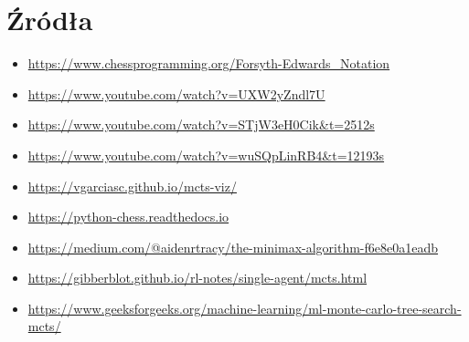 \section*{Źródła}
\begin{itemize}
    \item \url{https://www.chessprogramming.org/Forsyth-Edwards_Notation}
    \item \url{https://www.youtube.com/watch?v=UXW2yZndl7U}
    \item \url{https://www.youtube.com/watch?v=STjW3eH0Cik&t=2512s}
    \item \url{https://www.youtube.com/watch?v=wuSQpLinRB4&t=12193s}
    \item \url{https://vgarciasc.github.io/mcts-viz/}
    \item \url{https://python-chess.readthedocs.io}
    \item \url{https://medium.com/@aidenrtracy/the-minimax-algorithm-f6e8e0a1eadb}
    \item \url{https://gibberblot.github.io/rl-notes/single-agent/mcts.html}
    \item \url{https://www.geeksforgeeks.org/machine-learning/ml-monte-carlo-tree-search-mcts/}
\end{itemize}